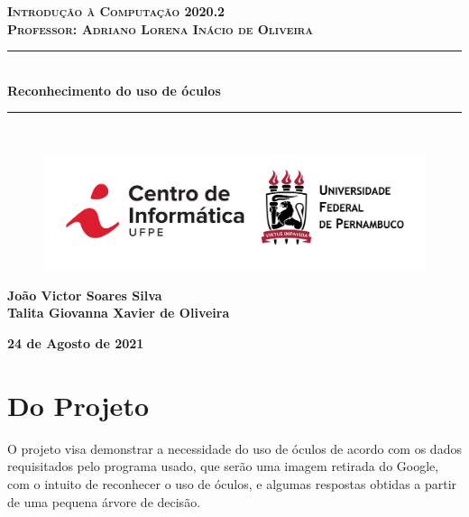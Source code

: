 \documentclass{article}
\begin{document}
\begin{titlepage}

\newcommand{\capaDisciplina}{Introdução à Computação 2020.2}
\newcommand{\capaProfessor}{Professor: Adriano Lorena Inácio de Oliveira}
\newcommand{\capaAtividade}{Reconhecimento do uso de óculos}
\newcommand{\capaAutores}{João Victor Soares Silva \\ Talita Giovanna Xavier de Oliveira}
\newcommand{\capaData}{24 de Agosto de 2021}

\newcommand{\HRule}{\rule{\linewidth}{0.5mm}}

\center

\textsc{\textbf{\Large \capaDisciplina}}\\[0.2cm]
\textsc{\textbf{\large \capaProfessor}}\\[0.5cm]


\vspace{5.0cm}

\HRule \\ [0.4cm]
{\huge \textbf{\capaAtividade}}\\[0.4cm]
\HRule \\ [1.4cm]

\vspace{3.0cm}
\begin{figure}[ht]
    \centering
    \includegraphics[scale= 0.2]{Horizontal-Vermelho-Logotipo-CIn-UFPE.png}
    \label{imagem_um}
\end{figure}

\textbf{\large \capaAutores}

\vspace{0.5cm}
\textbf{\capaData}

\end{titlepage}

\section{Do Projeto}
O projeto visa demonstrar a necessidade do uso de óculos de acordo com os dados requisitados pelo programa usado, que serão uma imagem retirada do Google, com o intuito de reconhecer o uso de óculos, e algumas respostas obtidas a partir de uma pequena árvore de decisão.
\end{document}
